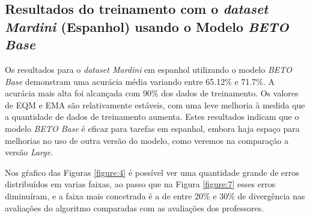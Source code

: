 \subsection{Resultados do treinamento com o \textit{dataset Mardini} (Espanhol) usando o Modelo \textit{BETO Base}}

Os resultados para o \textit{dataset Mardini} em espanhol utilizando o modelo \textit{BETO Base} demonstram uma acurácia média variando entre 65.12\% e 71.7\%. A acurácia mais alta foi alcançada com 90\% dos dados de treinamento. Os valores de EQM e EMA são relativamente estáveis, com uma leve melhoria à medida que a quantidade de dados de treinamento aumenta. Estes resultados indicam que o modelo \textit{BETO Base} é eficaz para tarefas em espanhol, embora haja espaço para melhorias no uso de outra versão do modelo, como veremos na comparação a versão \textit{Large}.

\begin{table}[h!]
\centering
{}
\caption{Resultados de Regressão para Diferentes Percentuais de Treino com o \textit{dataset Mardini} (Espanhol) usando o Modelo \textit{BETO Base}}
\label{tab:resultados_regressao_espanhol_base}
\end{table}

Nos gŕafico das Figuras \ref{figure:4} é possível ver uma quantidade grande de erros distribuídos em varias faixas, ao passo que na Figura \ref{figure:7} esses erros diminuíram, e a faixa mais concetrada é a de entre 20\% e 30\% de divergência nas avaliações do algoritmo comparadas com as avaliações dos professores.

